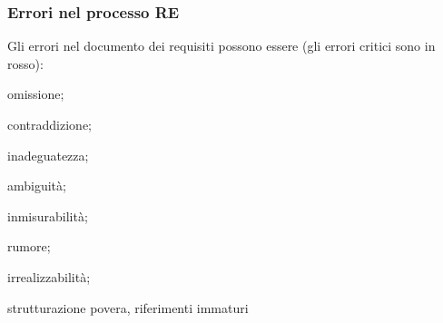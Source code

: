 \documentclass[italian]{article}
\begin{document}
		\subsubsection{Errori nel processo RE}
		Gli errori nel documento dei requisiti possono essere (gli errori critici sono in rosso):
		\begin{itemize}
			{\color{red}\item omissione;
			\item contraddizione;
			\item inadeguatezza;
			\item ambiguità;}
			\item inmisurabilità;
			\item rumore;
			\item irrealizzabilità;
			\item strutturazione povera, riferimenti immaturi
		\end{itemize}
\end{document}
